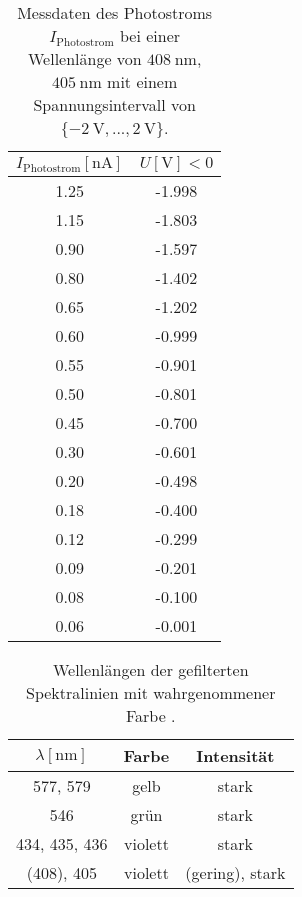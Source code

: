 \begin{table}
    \centering
    \caption{Messdaten des Photostroms $I_{\text{Photostrom}}$ bei einer Wellenlänge von $\SI{408}{\nano\meter}$, $\SI{405}{\nano\meter}$ mit einem Spannungsintervall von $\{\SI{-2}{\volt},... ,\SI{2}{\volt}\}$.}
    \label{tab:tab4}
    \begin{tabular}{c c}
        \toprule
        $I_{\text{Photostrom}}[\si{\nano\ampere}]$ & $U [\si{\volt}] < 0$ \\
        \midrule
1.25        &        -1.998   \\       
1.15        &        -1.803   \\
0.90        &        -1.597   \\
0.80        &        -1.402   \\
0.65        &        -1.202   \\
0.60        &        -0.999   \\
0.55        &        -0.901   \\
0.50        &        -0.801   \\
0.45        &        -0.700   \\
0.30        &        -0.601   \\
0.20        &        -0.498   \\
0.18        &        -0.400   \\
0.12        &        -0.299   \\       
0.09        &        -0.201   \\
0.08        &        -0.100   \\
0.06        &        -0.001   \\    

       \bottomrule
    \end{tabular}
\end{table}

\begin{table}
    \centering
    \caption{Wellenlängen der gefilterten Spektralinien mit wahrgenommener Farbe \cite{skript}.}
    \label{tab:tab5}
    \begin{tabular}{c c c}
        \toprule
        $\lambda [\si{\nano\meter}]$ & Farbe & Intensität \\
        \midrule
        577, 579 & gelb & stark  \\
        546& grün & stark \\
        434, 435, 436& violett & stark \\
        (408), 405 & violett & (gering), stark \\
       \bottomrule
    \end{tabular}
\end{table}